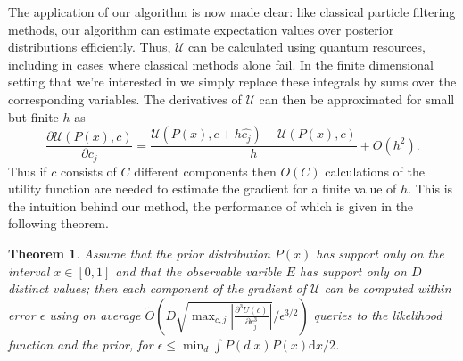 \documentclass[aps,amsmath,onecolumn,amssymb,notitlepage]{revtex4-1}
\newtheorem{theorem}{Theorem}
\begin{document}
The application of our algorithm is now made clear: like classical particle
filtering methods, our algorithm can estimate expectation values over
posterior distributions efficiently. Thus, $\mathcal{U}$ can be calculated using quantum resources,
including in cases where classical methods alone fail.
In the finite dimensional setting that we're interested in we simply replace these integrals by sums over the corresponding variables.
The derivatives of $\mathcal{U}$ can then be approximated for small but finite $h$ as 
\begin{equation}
\frac{\partial \mathcal{U}(P(x),c)}{\partial c_j} = \frac{\mathcal{U}(P(x),c+h\hat{c_j})-\mathcal{U}(P(x),c)}{h} + O(h^2).
\end{equation}
Thus if $c$ consists of $C$ different components then $O(C)$ calculations of the utility function are needed to estimate the gradient for a finite value of $h$.
This is the intuition behind our method, the performance of which is given in the following theorem.
\begin{theorem}
Assume that the prior distribution $P(x)$ has support only on the interval $x\in [0,1]$ and that the observable varible $E$ has support only on $D$ distinct values; then each component of the gradient of $\mathcal{U}$ can be computed within error $\epsilon$ using on average $\tilde{O}\left(D\sqrt{\max_{c,j}\left|\frac{\partial^3 U(c)}{\partial c_j^3} \right|}/\epsilon^{3/2}\right)$ queries to the likelihood function and the prior, for $\epsilon \le \min_d \int P(d|x)P(x) \mathrm{d}x/2$.
\end{theorem}
\end{document}
